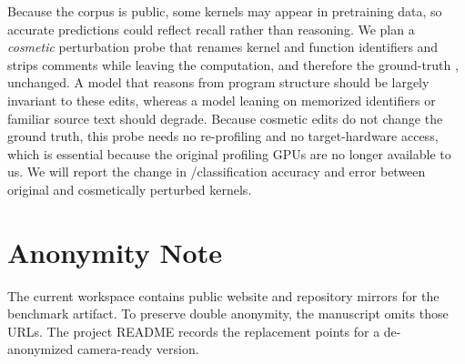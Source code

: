 Because the corpus is public, some kernels may appear in pretraining data, so accurate predictions could reflect recall rather than reasoning.
We plan a \emph{cosmetic} perturbation probe that renames kernel and function identifiers and strips comments while leaving the computation, and therefore the ground-truth \rai, unchanged.
A model that reasons from program structure should be largely invariant to these edits, whereas a model leaning on memorized identifiers or familiar source text should degrade.
Because cosmetic edits do not change the ground truth, this probe needs no re-profiling and no target-hardware access, which is essential because the original profiling GPUs are no longer available to us.
We will report the change in \bandwidthbound/\computebound classification accuracy and \rai error between original and cosmetically perturbed kernels.

\section{Anonymity Note}

The current workspace contains public website and repository mirrors for the benchmark artifact.
To preserve double anonymity, the manuscript omits those URLs.
The project README records the replacement points for a de-anonymized camera-ready version.
